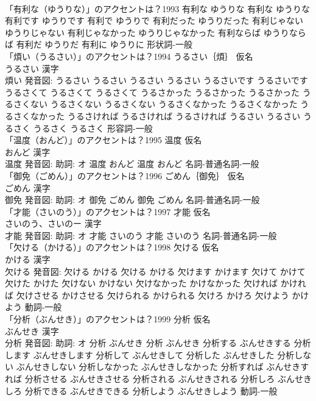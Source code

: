 \documentclass[8pt]{extreport}
\begin{document}
\begin{CJK}{UTF8}{min}
\\	「有利な（ゆうりな）」のアクセントは？1993		有利な ゆうりな		有利な ゆうりな 有利です ゆうりです 有利で ゆうりで 有利だった ゆうりだった 有利じゃない ゆうりじゃない 有利じゃなかった ゆうりじゃなかった 有利ならば ゆうりならば 有利だ ゆうりだ 有利に ゆうりに				形状詞-一般 
\\	「煩い（うるさい）」のアクセントは？1994	うるさい｛煩｝ 仮名　
\\	うるさい 漢字　
\\	煩い 発音図:	うるさい うるさい		うるさい うるさい うるさいです うるさいです うるさくて うるさくて うるさくて うるさかった うるさかった うるさかった うるさくない うるさくない うるさくない うるさくなかった うるさくなかった うるさくなかった うるさければ うるさければ うるさければ うるさい うるさい うるさく うるさく うるさく				形容詞-一般 
\\	「温度（おんど）」のアクセントは？1995	温度 仮名　
\\	おんど 漢字　
\\	温度 発音図: 助詞: オ	温度 おんど		温度 おんど				名詞-普通名詞-一般 
\\	「御免（ごめん）」のアクセントは？1996	ごめん｛御免｝ 仮名　
\\	ごめん 漢字　
\\	御免 発音図: 助詞: オ	御免 ごめん		御免 ごめん				名詞-普通名詞-一般 
\\	「才能（さいのう）」のアクセントは？1997	才能 仮名　
\\	さいのう、さいのー 漢字　
\\	才能 発音図: 助詞: オ	才能 さいのう		才能 さいのう				名詞-普通名詞-一般 
\\	「欠ける（かける）」のアクセントは？1998	欠ける 仮名　
\\	かける 漢字　
\\	欠ける 発音図:	欠ける かける		欠ける かける 欠けます かけます 欠けて かけて 欠けた かけた 欠けない かけない 欠けなかった かけなかった 欠ければ かければ 欠けさせる かけさせる 欠けられる かけられる 欠けろ かけろ 欠けよう かけよう				動詞-一般 
\\	「分析（ぶんせき）」のアクセントは？1999	分析 仮名　
\\	ぶんせき 漢字　
\\	分析 発音図: 助詞: オ	分析 ぶんせき		分析 ぶんせき 分析する ぶんせきする 分析します ぶんせきします 分析して ぶんせきして 分析した ぶんせきした 分析しない ぶんせきしない 分析しなかった ぶんせきしなかった 分析すれば ぶんせきすれば 分析させる ぶんせきさせる 分析される ぶんせきされる 分析しろ ぶんせきしろ 分析できる ぶんせきできる 分析しよう ぶんせきしよう				動詞-一般 

\end{CJK}
\end{document}
